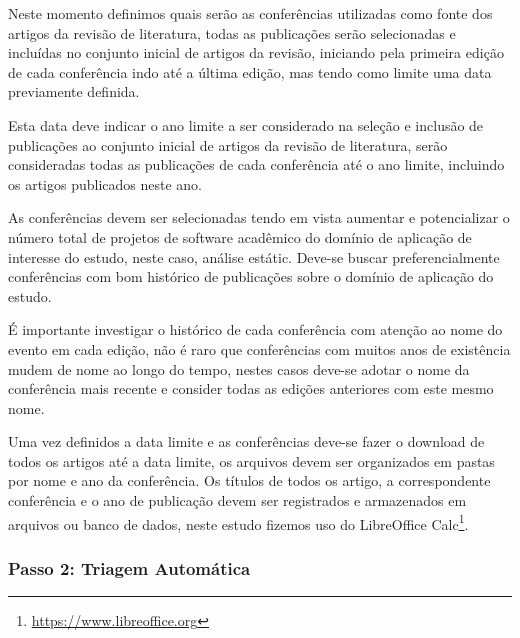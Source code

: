 
Neste momento definimos quais serão as conferências utilizadas como fonte dos
artigos da revisão de literatura, todas as publicações serão selecionadas e
incluídas no conjunto inicial de artigos da revisão, iniciando pela primeira
edição de cada conferência indo até a última edição, mas tendo como limite uma
data previamente definida.

Esta data deve indicar o ano limite a ser considerado na seleção e inclusão de
publicações ao conjunto inicial de artigos da revisão de literatura, serão
consideradas todas as publicações de cada conferência até o ano limite,
incluindo os artigos publicados neste ano.

As conferências devem ser selecionadas tendo em vista aumentar e potencializar
o número total de projetos de software acadêmico do domínio de aplicação de
interesse do estudo, neste caso, análise estátic. Deve-se buscar
preferencialmente conferências com bom histórico de publicações sobre o domínio
de aplicação do estudo.

É importante investigar o histórico de cada conferência com atenção ao nome do
evento em cada edição, não é raro que conferências com muitos anos de
existência mudem de nome ao longo do tempo, nestes casos deve-se adotar o nome
da conferência mais recente e consider todas as edições anteriores com este
mesmo nome.


Uma vez definidos a data limite e as conferências deve-se fazer o download de
todos os artigos até a data limite, os arquivos devem ser organizados em pastas
por nome e ano da conferência. Os títulos de todos os artigo, a correspondente
conferência e o ano de publicação devem ser registrados e armazenados em
arquivos ou banco de dados, neste estudo fizemos uso do
LibreOffice Calc\footnote{\url{https://www.libreoffice.org}}.


\subsubsection{Passo 2: Triagem Automática} \label{estudo1:planejamento:filtro}

